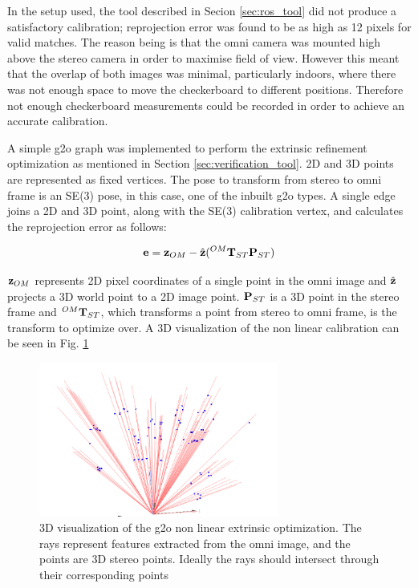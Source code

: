 In the setup used, the tool described in Secion \ref{sec:ros_tool} did not produce a satisfactory calibration; reprojection error was found to be as high as 12 pixels for valid matches.  The reason being is that the omni camera was mounted high above the stereo camera in order to maximise field of view.  However this meant that the overlap of both images was minimal, particularly indoors, where there was not enough space to move the checkerboard to different positions.  Therefore not enough checkerboard measurements could be recorded in order to achieve an accurate calibration.

A simple g2o graph was implemented to perform the extrinsic refinement optimization as mentioned in Section \ref{sec:verification_tool}.  2D and 3D points are represented as fixed vertices.  The pose to transform from stereo to omni frame is an SE(3) pose, in this case, one of the inbuilt g2o types.  A single edge joins a 2D and 3D point, along with the SE(3) calibration vertex, and calculates the reprojection error as follows:

\begin{align}
 \mathbf e = \mathbf z_{OM} - \hat{\mathbf z}( ^{OM}\mathbf T_{ST} \mathbf P_{ST})
\end{align}

$\mathbf z_{OM}$ represents 2D pixel coordinates of a single point in the omni image and $\hat{\mathbf z}$ projects a 3D world point to a 2D image point.  $\mathbf P_{ST}$ is a 3D point in the stereo frame and $^{OM}\mathbf T_{ST}$, which transforms a point from stereo to omni frame, is the transform to optimize over.  A 3D visualization of the non linear calibration can be seen in Fig. \ref{fig:g2o_cal_vis}

\begin{figure}[h!]
  \centering
    \includegraphics[width=0.7\textwidth]{chapters/images/g2o_cal_vis}
  \caption{3D visualization of the g2o non linear extrinsic optimization.  The rays represent features extracted from the omni image, and the points are 3D stereo points.  Ideally the rays should intersect through their corresponding points}
  \label{fig:g2o_cal_vis}
\end{figure}

